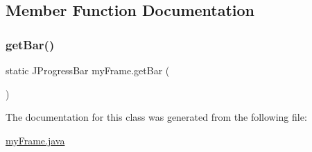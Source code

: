 \subsection{Member Function Documentation}
\hypertarget{classmy_frame_ab4821a86dfc373a36ef2d654cf81f238}{}\label{classmy_frame_ab4821a86dfc373a36ef2d654cf81f238} 
\subsubsection{\texorpdfstring{get\+Bar()}{getBar()}}
{\footnotesize\ttfamily static J\+Progress\+Bar my\+Frame.\+get\+Bar (\begin{DoxyParamCaption}{ }\end{DoxyParamCaption})\hspace{0.3cm}{\ttfamily [static]}}



The documentation for this class was generated from the following file\+:\begin{DoxyCompactItemize}
\item 
\hyperlink{my_frame_8java}{my\+Frame.\+java}\end{DoxyCompactItemize}
